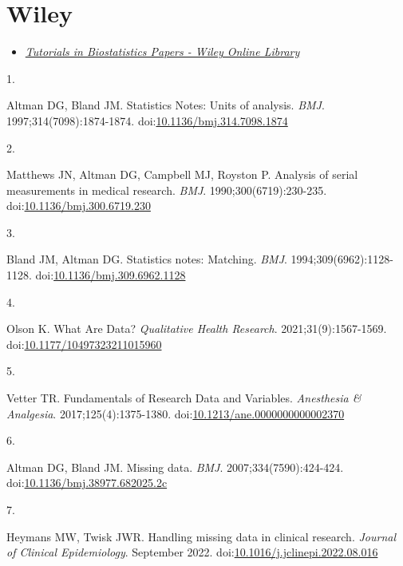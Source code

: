 \documentclass[
]{book}
\providecommand{\tightlist}{%
  \setlength{\itemsep}{0pt}\setlength{\parskip}{0pt}}
\newlength{\cslhangindent}
\newlength{\csllabelwidth}
\newlength{\cslentryspacingunit} %
\newenvironment{CSLReferences}[2] %
 {%
  \setlength{\parindent}{0pt}
  \ifodd #1
  \let\oldpar\par
  \def\par{\hangindent=\cslhangindent\oldpar}
  \fi
  \setlength{\parskip}{#2\cslentryspacingunit}
 }%
 {}
\newcommand{\CSLLeftMargin}[1]{\parbox[t]{\csllabelwidth}{#1}}
\newcommand{\CSLRightInline}[1]{\parbox[t]{\linewidth - \csllabelwidth}{#1}\break}
\begin{document}
\hypertarget{wiley}{%
\section{Wiley}\label{wiley}}

\begin{itemize}
\tightlist
\item
  \href{https://onlinelibrary.wiley.com/page/journal/10970258/homepage/tutorials.htm}{\emph{Tutorials in Biostatistics Papers - Wiley Online Library}}
\end{itemize}

\hypertarget{refs}{}
\begin{CSLReferences}{0}{0}
\leavevmode{}%
\CSLLeftMargin{1. }%
\CSLRightInline{Altman DG, Bland JM. Statistics Notes: Units of analysis. \emph{BMJ}. 1997;314(7098):1874-1874. doi:\href{https://doi.org/10.1136/bmj.314.7098.1874}{10.1136/bmj.314.7098.1874}}

\leavevmode{}%
\CSLLeftMargin{2. }%
\CSLRightInline{Matthews JN, Altman DG, Campbell MJ, Royston P. Analysis of serial measurements in medical research. \emph{BMJ}. 1990;300(6719):230-235. doi:\href{https://doi.org/10.1136/bmj.300.6719.230}{10.1136/bmj.300.6719.230}}

\leavevmode{}%
\CSLLeftMargin{3. }%
\CSLRightInline{Bland JM, Altman DG. Statistics notes: Matching. \emph{BMJ}. 1994;309(6962):1128-1128. doi:\href{https://doi.org/10.1136/bmj.309.6962.1128}{10.1136/bmj.309.6962.1128}}

\leavevmode{}%
\CSLLeftMargin{4. }%
\CSLRightInline{Olson K. What Are Data? \emph{Qualitative Health Research}. 2021;31(9):1567-1569. doi:\href{https://doi.org/10.1177/10497323211015960}{10.1177/10497323211015960}}

\leavevmode{}%
\CSLLeftMargin{5. }%
\CSLRightInline{Vetter TR. Fundamentals of Research Data and Variables. \emph{Anesthesia \& Analgesia}. 2017;125(4):1375-1380. doi:\href{https://doi.org/10.1213/ane.0000000000002370}{10.1213/ane.0000000000002370}}

\leavevmode{}%
\CSLLeftMargin{6. }%
\CSLRightInline{Altman DG, Bland JM. Missing data. \emph{BMJ}. 2007;334(7590):424-424. doi:\href{https://doi.org/10.1136/bmj.38977.682025.2c}{10.1136/bmj.38977.682025.2c}}

\leavevmode{}%
\CSLLeftMargin{7. }%
\CSLRightInline{Heymans MW, Twisk JWR. Handling missing data in clinical research. \emph{Journal of Clinical Epidemiology}. September 2022. doi:\href{https://doi.org/10.1016/j.jclinepi.2022.08.016}{10.1016/j.jclinepi.2022.08.016}}


\end{CSLReferences}
\end{document}
